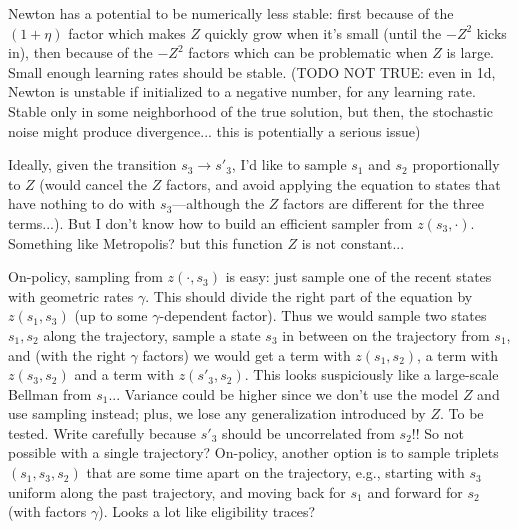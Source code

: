 \documentclass[11pt,a4paper]{article}
\begin{document}
Newton has a potential to be numerically less stable: first because of
the $(1+\eta)$ factor which makes $Z$ quickly grow when it's small (until
the $-Z^2$ kicks in), then because of the $-Z^2$ factors which can be
problematic when $Z$ is large. Small enough learning rates should be
stable. (TODO NOT TRUE: even in 1d, Newton is unstable if initialized to
a negative number, for any learning rate. Stable only in some
neighborhood of the true solution, but then, the stochastic noise might
produce divergence... this is potentially a serious issue)

Ideally, given the transition $s_3\to s'_3$, I'd like to sample $s_1$ and
$s_2$ proportionally to $Z$ (would cancel the $Z$ factors, and avoid
applying the equation to states that have nothing to do with
$s_3$—although the $Z$ factors are different for the three terms...). But
I don't know how to build an efficient sampler from $z(s_3,\cdot)$.
Something like Metropolis? but this function $Z$ is not constant...

On-policy, sampling from $z(\cdot,s_3)$ is easy: just sample one of the
recent states with geometric rates $\gamma$. This should divide the
right part of the equation by $z(s_1,s_3)$ (up to some $\gamma$-dependent
factor). Thus we would sample two states $s_1,s_2$ along the trajectory,
sample a state $s_3$ in between on the trajectory from $s_1$, and (with
the right $\gamma$ factors) we would get a term with $z(s_1,s_2)$, a term
with $z(s_3,s_2)$ and a term with $z(s'_3,s_2)$. This looks suspiciously
like a large-scale Bellman from $s_1$... Variance could be higher since
we don't use the model $Z$ and use sampling instead; plus, we lose any
generalization introduced by $Z$. To be tested. Write
carefully because $s'_3$ should be uncorrelated from $s_2$!! So not
possible with a single
trajectory?
On-policy, another
option is to sample triplets $(s_1,s_3,s_2)$ that are some time apart on
the trajectory, e.g., starting with $s_3$ uniform along the past
trajectory, and moving back for $s_1$ and forward for $s_2$ (with factors
$\gamma$). Looks a lot like eligibility traces?
\end{document}
